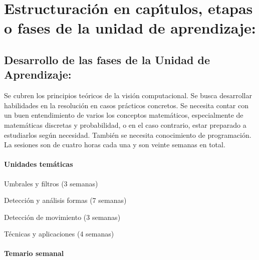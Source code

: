 \section{Estructuraci\'{o}n en cap\'{\i}tulos, etapas o fases de la unidad de
  aprendizaje:}

\subsection{Desarrollo de las fases de la Unidad de Aprendizaje:}

\quad

Se cubren los principios te\'{o}ricos de la visi\'{o}n computacional.  Se
busca desarrollar habilidades en la resoluci\'{o}n en casos
pr\'{a}cticos concretos. Se necesita contar con un buen entendimiento
de varios los conceptos matem\'{a}ticos, especialmente de
matem\'{a}ticas discretas y probabilidad, o en el caso contrario,
estar preparado a estudiarlos seg\'{u}n necesidad. Tambi\'{e}n se
necesita conocimiento de programaci\'{o}n.  La sesiones son de cuatro
horas cada una y son veinte semanas en total.

\paragraph{Unidades tem\'{a}ticas}

\begin{description}[itemsep=-3pt]
\item[UT1] Umbrales y filtros (3 semanas)
\item[UT2] Detecci\'{o}n y an\'{a}lisis formas (7 semanas)
\item[UT3] Detecci\'{o}n de movimiento (3 semanas)
\item[UT4] T\'{e}cnicas y aplicaciones (4 semanas)
\end{description}



\paragraph{Temario semanal}

